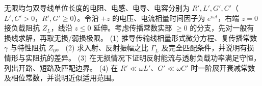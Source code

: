 无限均匀双导线单位长度的电阻、电感、电导、电容分别为 \(R',L',G',C'\)（\(L',C'>0\)，\(R',G'\ge0\)）。令沿 \(+z\) 的电压、电流相量时间因子为 \(e^{i\omega t}\)，右端 \(z=0\) 接负载阻抗 \(Z_L\)，线沿 \(z\le0\) 延伸。考虑传播常数实部 \(\ge0\) 的分支，先对一般有损线求解，再取无损/弱损极限。
(1) 推导传输线相量形式微分方程、复传播常数 \(\gamma\) 与特性阻抗 \(Z_0\)。
(2) 求入射、反射振幅之比 \(\Gamma_L\) 及完全匹配条件，并说明有损情形与实阻抗的差异。
(3) 在无损情况下证明反射能流与透射负载功率满足守恒，列出开路、短路及匹配边界。
(4) 在 \(R'\ll\omega L'\)、\(G'\ll\omega C'\) 时一阶展开衰减常数及相位常数，并说明近似适用范围。
